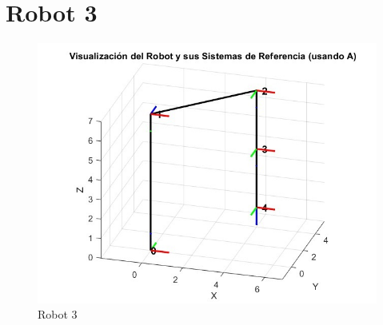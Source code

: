 \section{Robot 3}

\begin{figure}
	\centering
	\includegraphics[width=0.5\linewidth]{img/Robot3}
	\caption{Robot 3}
	\label{fig:robot3}
\end{figure}
